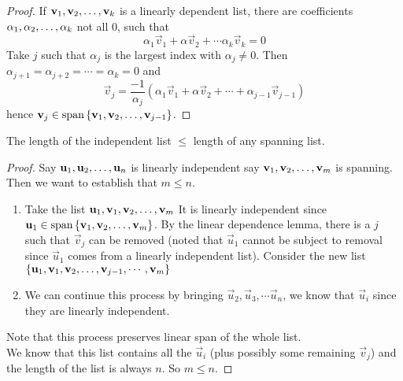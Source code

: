 \begin{proof}
    If ${\mathbf v}_1,{\mathbf v}_2, \ldots, {\mathbf v}_{k}$ is a linearly dependent list, there are coefficients ${\alpha}_1,{\alpha}_2, \ldots, {\alpha}_{k}$ not all $0$, such that 
    \[ \alpha_1 \vec v_1 + \alpha \vec v_2 + \cdots \alpha_k \vec v_k = 0\]
    Take $j$ such that $\alpha_j$ is the largest index with $\alpha_j \neq 0$. Then $\alpha_{j + 1}=  \alpha_{j + 2} = \cdots = \alpha_k = 0$ and \[ \vec v_j = \frac{-1}{\alpha_j} (\alpha_1 \vec v_1 + \alpha \vec v_2 + \cdots + \alpha_{j - 1} \vec v_{j-1})\] hence $\mathbf v_j \in \text{span} \left\{ {\mathbf v}_1,{\mathbf v}_2, \ldots, {\mathbf v}_{j-1} \right\}$.
\end{proof}
\begin{lemma}
    The length of the independent list $\leq$ length of any spanning list. 
\end{lemma}
\begin{proof}
    Say ${\mathbf u}_1,{\mathbf u}_2, \ldots, {\mathbf u}_{n}$ is linearly independent say ${\mathbf v}_1,{\mathbf v}_2, \ldots, {\mathbf v}_{m}$ is spanning. Then we want to establish that $ m \leq n$. 
    \begin{enumerate}[label = {Step \arabic*.}]
        \item Take the list $\mathbf u_1, {\mathbf v}_1,{\mathbf v}_2, \ldots, {\mathbf v}_{m}$ It is linearly independent since $\mathbf u_1 \in \text{span} \left\{ {\mathbf v}_1,{\mathbf v}_2, \ldots, {\mathbf v}_{m} \right\}$. By the linear dependence lemma, there is a $j$ such that $\vec v_j$ can be removed (noted that $\vec u_1$ cannot be subject to removal since $\vec u_1$ comes from a linearly independent list). Consider the new list $\left\{ \mathbf u_1, {\mathbf v}_1,{\mathbf v}_2, \ldots, {\mathbf v}_{j-1} , \cdots, \mathbf v_m\right\}$
        \item We can continue this process by bringing $\vec u_2, \vec u_3, \cdots \vec u_n$, we know that $\vec u_i$ since they are linearly independent.
    \end{enumerate}
    Note that this process preserves linear span of the whole list.  \\
    We know that this list contains all the $\vec u_i$ (plus possibly some remaining $\vec v_j$) and the length of the list is always $n$. So $\boxed{m \leq n}$.
\end{proof}
